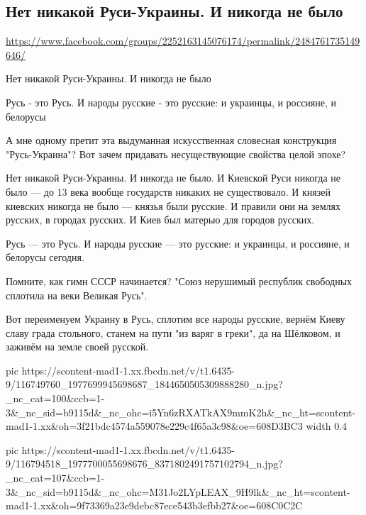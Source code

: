 
 
 
 
 

\subsection{Нет никакой Руси-Украины. И никогда не было}

\url{https://www.facebook.com/groups/2252163145076174/permalink/2484761735149646/}

Нет никакой Руси-Украины. И никогда не было

Русь - это Русь. И народы русские - это русские: и украинцы, и россияне, и белорусы

А мне одному претит эта выдуманная искусственная словесная конструкция
"Русь-Украина"? Вот зачем придавать несуществующие свойства целой эпохе?

Нет никакой Руси-Украины. И никогда не было. И Киевской Руси никогда не было —
до 13 века вообще государств никаких не существовало. И князей киевских никогда
не было — князья были русские. И правили они на землях русских, в городах
русских. И Киев был матерью для городов русских.

Русь — это Русь. И народы русские — это русские: и украинцы, и россияне, и
белорусы сегодня.

Помните, как гимн СССР начинается? "Союз нерушимый республик свободных сплотила
на веки Великая Русь".

Вот переименуем Украину в Русь, сплотим все народы русские, вернём Киеву славу
града стольного, станем на пути "из варяг в греки", да на Шёлковом, и заживём
на земле своей русской.

\ifcmt
  pic https://scontent-mad1-1.xx.fbcdn.net/v/t1.6435-9/116749760_1977699945698687_1844650505309888280_n.jpg?_nc_cat=100&ccb=1-3&_nc_sid=b9115d&_nc_ohc=i5Yn6zRXATkAX9mmK2h&_nc_ht=scontent-mad1-1.xx&oh=3f21bdc4574a559078e229c4f65a3c98&oe=608D3BC3
  width 0.4
	
  pic https://scontent-mad1-1.xx.fbcdn.net/v/t1.6435-9/116794518_1977700055698676_8371802491757102794_n.jpg?_nc_cat=107&ccb=1-3&_nc_sid=b9115d&_nc_ohc=M31Jo2LYpLEAX_9H9lk&_nc_ht=scontent-mad1-1.xx&oh=9f73369a23e9debc87ece543b3efbb27&oe=608C0C2C	

